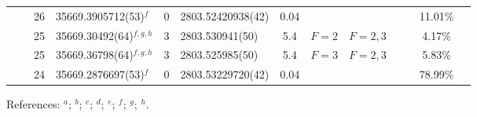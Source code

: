 \begin{table*}
\begin{center}
{\begin{tabular}{:l;l;c;l;c;l;c;l;l;c;c;c;c}
\rowstyle{\itshape}               &        & 26        & 35669.3905712(53)$^{f}$          & 0 & 2803.52420938(42)  & 0.04 & $                                        $ & $                                        $ & $      $ &              & 11.01\%   & $     ^{}     $\\
\rowstyle{\itshape}               &        & 25        & 35669.30492(64)$^{f,g,h}$        & 3 &   2803.530941(50)  &  5.4 & $F=2                                     $ & $F=2,3                                   $ & $      $ &              & 4.17\%    & $     ^{}     $\\
\rowstyle{\itshape}               &        & 25        & 35669.36798(64)$^{f,g,h}$        & 3 &   2803.525985(50)  &  5.4 & $F=3                                     $ & $F=2,3                                   $ & $      $ &              & 5.83\%    & $     ^{}     $\\
\rowstyle{\itshape}               &        & 24        & 35669.2876697(53)$^{f}$          & 0 & 2803.53229720(42)  & 0.04 & $                                        $ & $                                        $ & $      $ &              & 78.99\%   & $     ^{}     $\\
\hline
\end{tabular}
}
{\footnotesize References:
$^{a}$\citet{Berengut:2005:044501};
$^{b}$\citet{Savukov:2008:042501};
$^{c}$\citet{Hannemann:2006:012505};
$^{d}$\citet{Salumbides:2006:L41};
$^{e}$\citet{Dzuba:2007:062510};
$^{f}$\citet{Batteiger:2009:022503};
$^{g}$\citet{Itano:1981:1364};
$^{h}$\citet{Sur:2005:25}.}
\end{center}
\end{table*}
